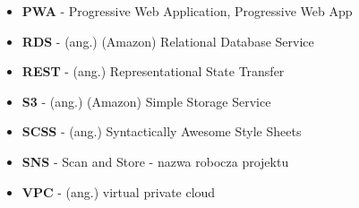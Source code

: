 \documentclass[../main.tex]{subfiles}
\begin{document}
\begin{itemize}
            \item \textbf{PWA} - Progressive Web Application, Progressive Web App
            \item \textbf{RDS} - (ang.) (Amazon) Relational Database Service
            \item \textbf{REST} - (ang.) Representational State Transfer
            \item \textbf{S3} - (ang.) (Amazon) Simple Storage Service
            \item \textbf{SCSS} - (ang.) Syntactically Awesome Style Sheets
            \item \textbf{SNS} - Scan and Store - nazwa robocza projektu
            \item \textbf{VPC} - (ang.) virtual private cloud
        \end{itemize}
\end{document}
